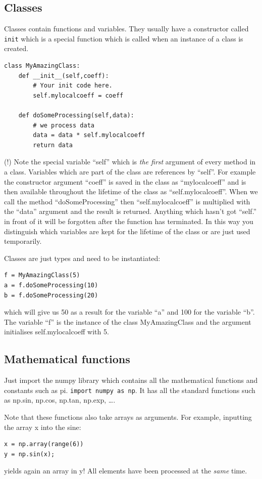 \documentclass[12pt,a4paper]{article}
\begin{document}
\subsection{Classes}
Classes contain functions and variables. They usually
have a constructor called \texttt{init} which is a special function which is called
when an instance of a class is created.
\begin{verbatim}
class MyAmazingClass:
    def __init__(self,coeff):
        # Your init code here.
        self.mylocalcoeff = coeff

    def doSomeProcessing(self,data):
        # we process data
        data = data * self.mylocalcoeff
        return data
\end{verbatim}
(!) Note the special variable ``self'' which is \textsl{the first}
argument of every method in a class. Variables which
are part of the class are references by ``self''. For
example the constructor argument ``coeff'' is saved
in the class as ``mylocalcoeff'' and is then available
throughout the lifetime of the class as ``self.mylocalcoeff''. When we call
the method ``doSomeProcessing'' then ``self.mylocalcoeff''
is multiplied with the ``data'' argument and the result
is returned. Anything which hasn't got ``self.'' in front
of it will be forgotten after the function has terminated.
In this way you distinguish which variables are kept
for the lifetime of the class or
are just used temporarily.

Classes are just types and need to be instantiated:
\begin{verbatim}
f = MyAmazingClass(5)
a = f.doSomeProcessing(10)
b = f.doSomeProcessing(20)
\end{verbatim}
which will give us 50 as a result for the variable ``a'' and
100 for the variable ``b''. The variable ``f'' is the instance
of the class MyAmazingClass and the argument initialises
self.mylocalcoeff with 5.


\subsection{Mathematical functions}
Just import the numpy library which contains all the
mathematical functions and constants such as pi.
\texttt{import numpy as np}. It has all the standard functions such
as np.sin, np.cos, np.tan, np.exp, \ldots.

Note that these functions also take arrays as arguments. For example,
inputting the array x into the sine:
\begin{verbatim}
x = np.array(range(6))
y = np.sin(x);
\end{verbatim}
yields again an array in y! All elements have been processed at the 
\emph{same} time.
\end{document}
